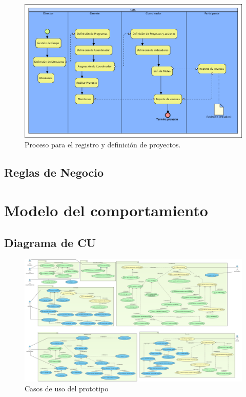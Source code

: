 \documentclass[10pt]{book}
\begin{document}
\begin{figure}[htbp!]
	\begin{center}
		\includegraphics[width=.8\textwidth]{images/proceso}
		\caption{Proceso para el registro y definición de proyectos.}
		\label{fig:default}
	\end{center}
\end{figure}

\section{Reglas de Negocio}



\chapter{Modelo del comportamiento}

\section{Diagrama de CU}

\begin{figure}[htbp!]
	\begin{center}
		\includegraphics[angle=90,height=\textheight]{images/casosDeUso}
		\caption{Casos de uso del prototipo}
		\label{fig:default}
	\end{center}
\end{figure}
\end{document}

